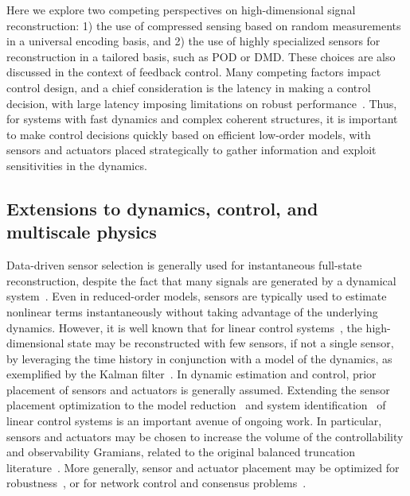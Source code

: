 \documentclass[letterpaper]{IEEEtran}
\begin{document}
Here we explore two competing perspectives on high-dimensional signal reconstruction:  1)  the use of compressed sensing based on random measurements in a universal encoding basis, and 2) the use of highly specialized sensors for reconstruction in a tailored basis, such as POD or DMD.  
These choices are also discussed in the context of feedback control.  
Many competing factors impact control design, and a chief consideration is the latency in making a control decision, with large latency imposing limitations on robust performance~\cite{sp:book,dp:book}.  
Thus, for systems with fast dynamics and complex coherent structures, it is important to make control decisions quickly based on efficient low-order models, with sensors and actuators placed strategically to gather information and exploit sensitivities in the dynamics.

 \subsection{Extensions to dynamics, control, and multiscale physics}
Data-driven sensor selection is generally used for instantaneous full-state reconstruction, despite the fact that many signals are generated by a dynamical system~\cite{guckenheimer_holmes,HLBR_turb}.  
Even in reduced-order models, sensors are typically used to estimate nonlinear terms instantaneously without taking advantage of the underlying dynamics.  
However, it is well known that for linear control systems~\cite{dp:book,sp:book}, the high-dimensional state may be reconstructed with few sensors, if not a single sensor, by leveraging the time history in conjunction with a model of the dynamics, as exemplified by the Kalman filter~\cite{Kalman1960jfe,Welch1995book}.  
In dynamic estimation and control, prior placement of sensors and actuators is generally assumed. 
Extending the sensor placement optimization to the model reduction~\cite{Moore1981ieeetac,Willcox2002aiaaj,Rowley2005ijbc} and system identification~\cite{ERA:1985,ljung:book,Juang1991nasatm,Juang1994book} of linear control systems is an important avenue of ongoing work.  
In particular, sensors and actuators may be chosen to increase the volume of the controllability and observability Gramians, related to the original balanced truncation literature~\cite{Moore1981ieeetac}.  
More generally, sensor and actuator placement may be optimized for robustness~\cite{Doyle:1978,Doyle:1981}, or for network control and consensus problems~\cite{Leonard2001cdc,Olfati2004ieeetac,Doyle2005pnas,Leonard2007pieee,Rahmani:SIAMJCO09}.
\end{document}
